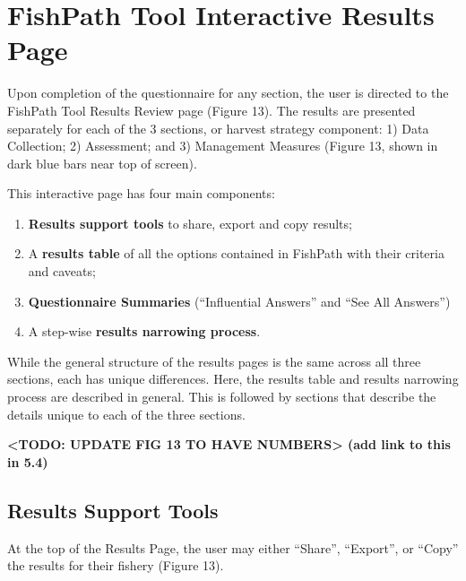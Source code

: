 \documentclass[11pt,]{book}
\providecommand{\tightlist}{%
  \setlength{\itemsep}{0pt}\setlength{\parskip}{0pt}}
\begin{document}
\hypertarget{fishpath-tool-interactive-results-page}{%
\chapter{FishPath Tool Interactive Results Page}\label{fishpath-tool-interactive-results-page}}

Upon completion of the questionnaire for any section, the user is directed to the FishPath Tool Results Review page (Figure 13). The results are presented separately for each of the 3 sections, or harvest strategy component: 1) Data Collection; 2) Assessment; and 3) Management Measures (Figure 13, shown in dark blue bars near top of screen).

This interactive page has four main components:

\begin{enumerate}
\def\labelenumi{\arabic{enumi}.}
\tightlist
\item
  \textbf{Results support tools} to share, export and copy results;
\item
  A \textbf{results table} of all the options contained in FishPath with their criteria and caveats;
\item
  \textbf{Questionnaire Summaries} (``Influential Answers'' and ``See All Answers'')
\item
  A step-wise \textbf{results narrowing process}.
\end{enumerate}

While the general structure of the results pages is the same across all three sections, each has unique differences. Here, the results table and results narrowing process are described in general. This is followed by sections that describe the details unique to each of the three sections.

\textbf{\textless TODO: UPDATE FIG 13 TO HAVE NUMBERS\textgreater{} (add link to this in 5.4) }

\hypertarget{results-support-tools}{%
\section{Results Support Tools}\label{results-support-tools}}

At the top of the Results Page, the user may either ``Share'', ``Export'', or ``Copy'' the results for their fishery (Figure 13).
\end{document}
